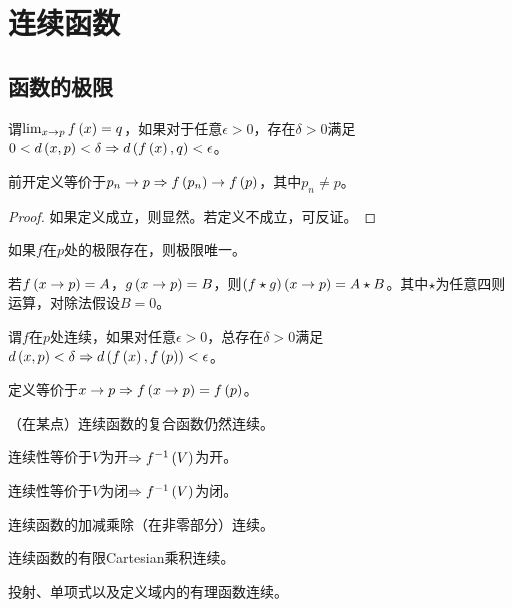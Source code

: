 \documentclass{ctexrep}
\begin{document}
  \section{连续函数}
  \subsection{函数的极限}
  \begin{definition}
    谓$\lim_{x\rightarrow p}f\left(x\right) = q$，如果对于任意$\epsilon>0$，存在$\delta>0$满足$0 < d\left(x,p\right) < \delta \Rightarrow d\left(f\left(x\right),q\right)<\epsilon$。
  \end{definition}
  \begin{theorem}
    前开定义等价于$p_n\rightarrow p\Rightarrow f\left(p_n\right)\rightarrow f\left(p\right)$，其中$p_n\neq p$。
  \end{theorem}
  \begin{proof}
    如果定义成立，则显然。若定义不成立，可反证。
  \end{proof}
  \begin{corollary}
    如果$f$在$p$处的极限存在，则极限唯一。
  \end{corollary}
  \begin{theorem}
    若$f\left(x\rightarrow p\right)=A$，$g\left(x\rightarrow p\right)=B$，则$\left(f\star g\right)\left(x\rightarrow p\right)=A\star B$。其中$\star$为任意四则运算，对除法假设$B=0$。
  \end{theorem}
  \begin{definition}
    谓$f$在$p$处连续，如果对任意$\epsilon>0$，总存在$\delta>0$满足$d\left(x,p\right)<\delta\Rightarrow d\left(f\left(x\right),f\left(p\right)\right)<\epsilon$。
  \end{definition}
  \begin{theorem}
    定义等价于$x\rightarrow p\Rightarrow f\left(x\rightarrow p\right)=f\left(p\right)$。
  \end{theorem}
  \begin{theorem}
    （在某点）连续函数的复合函数仍然连续。
  \end{theorem}
  \begin{theorem}
    连续性等价于$V$为开$\Rightarrow f^{-1}\left(V\right)$为开。
  \end{theorem}
  \begin{theorem}
    连续性等价于$V$为闭$\Rightarrow f^{-1}\left(V\right)$为闭。
  \end{theorem}
  \begin{theorem}
    连续函数的加减乘除（在非零部分）连续。
  \end{theorem}
  \begin{theorem}
    连续函数的有限Cartesian乘积连续。
  \end{theorem}
  \begin{ex}
    投射、单项式以及定义域内的有理函数连续。
  \end{ex}
\end{document}
